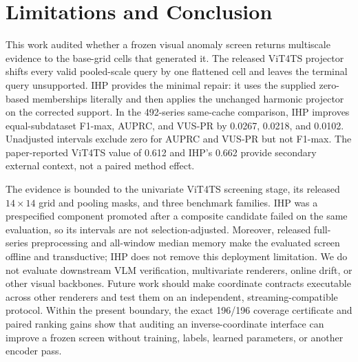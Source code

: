 \section{Limitations and Conclusion}

This work audited whether a frozen visual anomaly screen returns multiscale
evidence to the base-grid cells that generated it. The released ViT4TS
projector shifts every valid pooled-scale query by one flattened cell and
leaves the terminal query unsupported. IHP provides the minimal repair: it
uses the supplied zero-based memberships literally and then applies the
unchanged harmonic projector on the corrected support. In the 492-series
same-cache comparison, IHP improves equal-subdataset F1-max, AUPRC, and VUS-PR
by 0.0267, 0.0218, and 0.0102. Unadjusted intervals exclude zero for AUPRC
and VUS-PR but not F1-max. The paper-reported ViT4TS value of 0.612 and IHP's
0.662 provide secondary external context, not a paired method effect.

The evidence is bounded to the univariate ViT4TS screening stage, its released
$14\times14$ grid and pooling masks, and three benchmark families. IHP was a
prespecified component promoted after a composite candidate failed on the same
evaluation, so its intervals are not selection-adjusted. Moreover, released
full-series preprocessing and all-window median memory make the evaluated
screen offline and transductive; IHP does not remove this deployment
limitation. We do not evaluate downstream VLM verification, multivariate
renderers, online drift, or other visual backbones. Future work should make
coordinate contracts executable across other renderers and test them on an
independent, streaming-compatible protocol. Within the present boundary, the
exact 196/196 coverage certificate and paired ranking gains show that auditing
an inverse-coordinate interface can improve a frozen screen without training,
labels, learned parameters, or another encoder pass.
